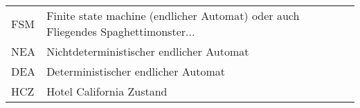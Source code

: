 \begin{tabular}{ll}
FSM & Finite state machine (endlicher Automat) oder auch Fliegendes Spaghettimonster...\\
NEA & Nichtdeterministischer endlicher Automat\\
DEA & Deterministischer endlicher Automat\\
HCZ & Hotel California Zustand\\
\end{tabular}
